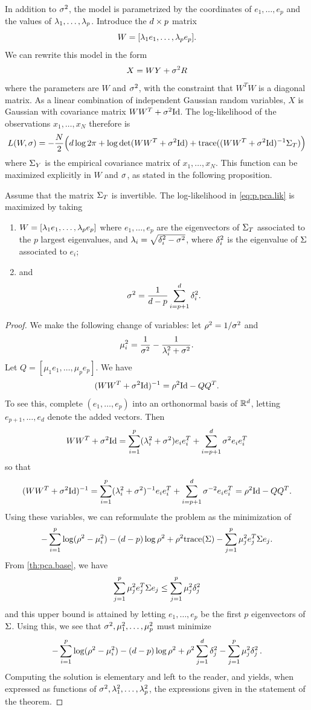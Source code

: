 In addition to $\sigma^2$, the model is parametrized by the coordinates of $e_1,
\ldots, e_p$ and the values of $\lambda_1, \ldots, \lambda_p$. Introduce the $d\times p$ matrix 
\[
W = [\lambda_1 e_1, \ldots, \lambda_p e_p].
\]
We can  rewrite this
model in the form
$$X = WY + \sigma^2 R$$
where the parameters are $W$ and $\sigma^2$, with the constraint that
$W^TW$ is a diagonal matrix. As a linear combination of independent Gaussian
random variables, $X$ is Gaussian with covariance matrix $WW^T +
\sig^2 \Id$. The log-likelihood of the observations $x_1, \ldots, x_N$ therefore is
\begin{equation}
\label{eq:p.pca.lik}
L(W, \sig) = -  \frac{N}{2} \Big(d \log 2\pi + \log \det(WW^T +
\sig^2 \Id) + \trace((WW^T + \sig^2 \Id)^{-1}\Sig_T)\Big)
\end{equation}
where $\Sigma_Y$ is the empirical covariance matrix of $x_1, \ldots,
x_N$. This function can be maximized explicitly in $W$ and $\sigma$, as stated in the following proposition. 
\begin{proposition}
\label{prop:p.pca}
Assume that the matrix $\Sigma_T$ is invertible.
The log-likelihood in \cref{eq:p.pca.lik} is maximized by taking 
\begin{enumerate}[label = (\roman*)]
\item $W = [\lambda_1e_1, \ldots, \lambda_pe_p]$ where $e_1, \ldots,
e_p$ are the eigenvectors of $\Sigma_T$  associated to the $p$ largest eigenvalues, and  $\lambda_i = \sqrt{\delta_i^2
- \sigma^2}$, where $\delta_i^2$ is the eigenvalue of $\Sigma$ associated to
$e_i$; 
\item and 
$$
\sigma^2 = \frac{1}{d-p} \sum_{i=p+1}^d \delta_i^2.
$$
\end{enumerate}
\end{proposition}
\begin{proof}
We make the following change of variables: let $\rho^2 = 1/\sigma^2$ and 
\[
\mu_i^2 = \frac{1}{\sigma^2} - \frac{1}{\lambda_i^2 + \sigma^2}.
\]
Let $Q = [\mu_1e_1, \ldots, \mu_pe_p]$. We have
\[
(WW^T + \sig^2\Id)^{-1} = \rho^2\Id - QQ^T.
\]
To see this, complete $(e_1, \ldots, e_p)$ into an orthonormal basis of ${\mathbb{R}}^d$, letting $e_{p+1}, \ldots, e_d$ denote the added vectors. Then
\[
WW^T + \sig^2\Id = \sum_{i=1}^p (\la_i^2 + \sig^2) e_ie_i^T + \sum_{i=p+1}^d \sig^2 e_ie_i^T
\]
so that
\[
(WW^T + \sig^2\Id)^{-1} = \sum_{i=1}^p (\la_i^2 + \sig^2)^{-1} e_ie_i^T + \sum_{i=p+1}^d \sig^{-2} e_ie_i^T = \rho^2\Id - QQ^T.
\]
Using these variables, we can reformulate the problem as the minimization of
\[
-\sum_{i=1}^p \log(\rho^2 - \mu_i^2) - (d-p)\log\rho^2 + \rho^2{\mathrm{trace}}(\Sigma) - \sum_{j=1}^p \mu^2_j e_j^T\Sigma e_j.
\]
From \cref{th:pca.base}, we have
\[
\sum_{j=1}^p \mu^2_j e_j^T\Sigma e_j \leq \sum_{j=1}^p \mu_j^2\delta_j^2
\]
and this upper bound is attained by letting $e_1, \ldots, e_p$ be the first $p$ eigenvectors of $\Sigma$. 
Using this, we see that $\sigma^2, \mu_1^2, \ldots, \mu_p^2$ must minimize
\[
-\sum_{i=1}^p \log(\rho^2 - \mu_i^2) - (d-p)\log\rho^2 + \rho^2\sum_{j=1}^d \delta_j^2 - \sum_{j=1}^p \mu_j^2\delta_j^2\,.
\]
Computing the solution is elementary and left to the reader, and yields, when expressed as functions of $\sigma^2, \lambda_1^2, \ldots, \lambda_p^2$, the expressions given in the statement of the theorem.
\end{proof}

